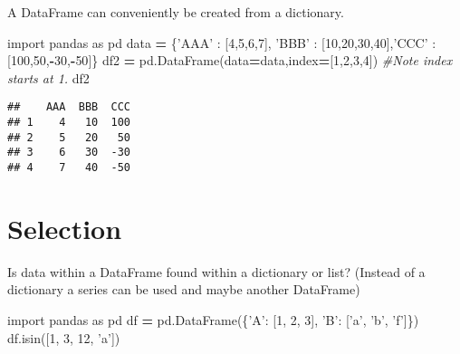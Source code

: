 \documentclass[]{book}
\newenvironment{Shaded}{\begin{snugshade}}{\end{snugshade}}
\newcommand{\CommentTok}[1]{\textcolor[rgb]{0.56,0.35,0.01}{\textit{#1}}}
\newcommand{\DecValTok}[1]{\textcolor[rgb]{0.00,0.00,0.81}{#1}}
\newcommand{\ImportTok}[1]{#1}
\newcommand{\NormalTok}[1]{#1}
\newcommand{\OperatorTok}[1]{\textcolor[rgb]{0.81,0.36,0.00}{\textbf{#1}}}
\newcommand{\StringTok}[1]{\textcolor[rgb]{0.31,0.60,0.02}{#1}}
\begin{document}
A DataFrame can conveniently be created from a dictionary.

\begin{Shaded}
\begin{Highlighting}[]
\ImportTok{import}\NormalTok{ pandas }\ImportTok{as}\NormalTok{ pd}
\NormalTok{data }\OperatorTok{=}\NormalTok{ \{}\StringTok{'AAA'}\NormalTok{ : [}\DecValTok{4}\NormalTok{,}\DecValTok{5}\NormalTok{,}\DecValTok{6}\NormalTok{,}\DecValTok{7}\NormalTok{], }\StringTok{'BBB'}\NormalTok{ : [}\DecValTok{10}\NormalTok{,}\DecValTok{20}\NormalTok{,}\DecValTok{30}\NormalTok{,}\DecValTok{40}\NormalTok{],}\StringTok{'CCC'}\NormalTok{ : [}\DecValTok{100}\NormalTok{,}\DecValTok{50}\NormalTok{,}\OperatorTok{-}\DecValTok{30}\NormalTok{,}\OperatorTok{-}\DecValTok{50}\NormalTok{]\}}
\NormalTok{df2 }\OperatorTok{=}\NormalTok{ pd.DataFrame(data}\OperatorTok{=}\NormalTok{data,index}\OperatorTok{=}\NormalTok{[}\DecValTok{1}\NormalTok{,}\DecValTok{2}\NormalTok{,}\DecValTok{3}\NormalTok{,}\DecValTok{4}\NormalTok{]) }\CommentTok{#Note index starts at 1.}
\NormalTok{df2}
\end{Highlighting}
\end{Shaded}

\begin{verbatim}
##    AAA  BBB  CCC
## 1    4   10  100
## 2    5   20   50
## 3    6   30  -30
## 4    7   40  -50
\end{verbatim}

\hypertarget{selection}{%
\section{Selection}\label{selection}}

Is data within a DataFrame found within a dictionary or list? (Instead of a dictionary a series can be used and maybe another DataFrame)

\begin{Shaded}
\begin{Highlighting}[]
\ImportTok{import}\NormalTok{ pandas }\ImportTok{as}\NormalTok{ pd}
\NormalTok{df }\OperatorTok{=}\NormalTok{ pd.DataFrame(\{}\StringTok{'A'}\NormalTok{: [}\DecValTok{1}\NormalTok{, }\DecValTok{2}\NormalTok{, }\DecValTok{3}\NormalTok{], }\StringTok{'B'}\NormalTok{: [}\StringTok{'a'}\NormalTok{, }\StringTok{'b'}\NormalTok{, }\StringTok{'f'}\NormalTok{]\})}
\NormalTok{df.isin([}\DecValTok{1}\NormalTok{, }\DecValTok{3}\NormalTok{, }\DecValTok{12}\NormalTok{, }\StringTok{'a'}\NormalTok{])}
\end{Highlighting}
\end{Shaded}
\end{document}

